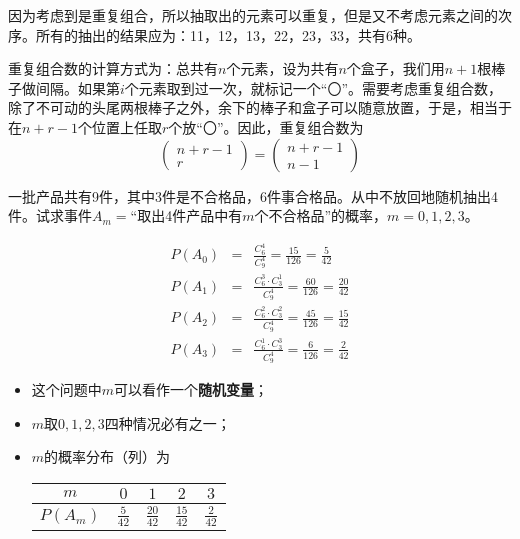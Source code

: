 \begin{solution}
因为考虑到是重复组合，所以抽取出的元素可以重复，但是又不考虑元素之间的次序。所有的抽出的结果应为：11，12，13，22，23，33，共有6种。
\end{solution}
\begin{note}
    重复组合数的计算方式为：总共有$n$个元素，设为共有$n$个盒子，我们用$n+1$根棒子做间隔。如果第$i$个元素取到过一次，就标记一个“〇”。需要考虑重复组合数，除了不可动的头尾两根棒子之外，余下的棒子和盒子可以随意放置，于是，相当于在$n+r-1$个位置上任取$r$个放“〇”。因此，重复组合数为
    $$
    \begin{pmatrix}n+r-1\\r\end{pmatrix} = \begin{pmatrix}n+r-1\\ n-1\end{pmatrix}
    $$
\end{note}


\begin{example}[(不放回抽样)]
    一批产品共有9件，其中3件是不合格品，6件事合格品。从中不放回地随机抽出4件。试求事件$A_m=$“取出4件产品中有$m$个不合格品”的概率，$m=0,1,2,3$。
    \end{example}
    \begin{solution}
        \begin{eqnarray*}
    P(A_0) &=& \frac{C_6^4}{C_9^4} = \frac{15}{126} = \frac{5}{42} \\
     P(A_1) &=&   \frac{C_6^3\cdot C_3^1}{C_9^4} =  \frac{60}{126} = \frac{20}{42} \\
     P(A_2) &=&   \frac{C_6^2\cdot C_3^2}{C_9^4} =  \frac{45}{126} = \frac{15}{42} \\
      P(A_3) &=&   \frac{C_6^1\cdot C_3^3}{C_9^4} =  \frac{6}{126} = \frac{2}{42}
    \end{eqnarray*}
    \end{solution}
\begin{remark}
\begin{itemize}
    \item 这个问题中$m$可以看作一个{\textbf{随机变量}}；
    \item $m$取$0,1,2,3$四种情况必有之一；
    \item $m$的概率分布（列）为\\
    \begin{table}[ht]
    \centering
    \begin{tabular}{c|cccc}
    \hline
    $m$ & $0$ & $1$ & $2$ & $3$\\
    \hline
    $P(A_m)$ & $\frac{5}{42}$ & $\frac{20}{42}$ &$\frac{15}{42}$ &$\frac{2}{42}$ \\
    \hline
    \end{tabular}
    \end{table}
    \end{itemize}
\end{remark}

